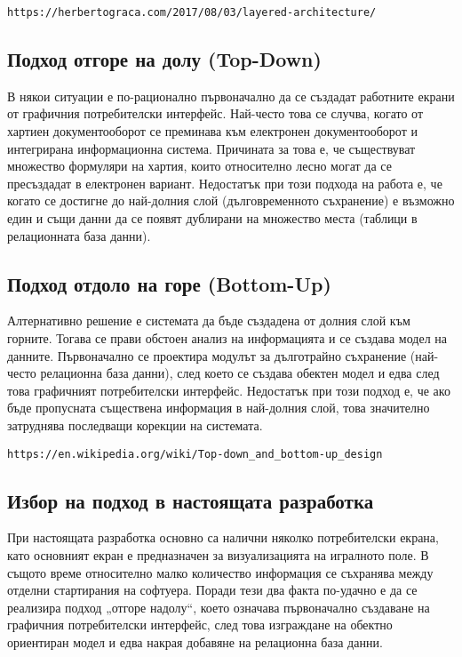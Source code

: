 \begin{lstlisting}
https://herbertograca.com/2017/08/03/layered-architecture/
\end{lstlisting}

\subsection{Подход отгоре на долу (Top-Down)}

В някои ситуации е по-рационално първоначално да се създадат работните екрани от графичния потребителски интерфейс. Най-често това се случва, когато от хартиен документооборот се преминава към електронен документооборот и интегрирана информационна система. Причината за това е, че съществуват множество формуляри на хартия, които относително лесно могат да се пресъздадат в електронен вариант. Недостатък при този подхода на работа е, че когато се достигне до най-долния слой (дълговременното съхранение) е възможно един и същи данни да се появят дублирани на множество места (таблици в релационната база данни). 

\subsection{Подход отдоло на горе (Bottom-Up)}

Алтернативно решение е системата да бъде създадена от долния слой към горните. Тогава се прави обстоен анализ на информацията и се създава модел на данните. Първоначално се проектира модулът за дълготрайно съхранение (най-често релационна база данни), след което се създава обектен модел и едва след това графичният потребителски интерфейс. Недостатък при този подход е, че ако бъде пропусната съществена информация в най-долния слой, това значително затруднява последващи корекции на системата. 

\begin{lstlisting}
https://en.wikipedia.org/wiki/Top-down_and_bottom-up_design
\end{lstlisting}

\subsection{Избор на подход в настоящата разработка}

При настоящата разработка основно са налични няколко потребителски екрана, като основният екран е предназначен за визуализацията на игралното поле. В същото време относително малко количество информация се съхранява между отделни стартирания на софтуера. Поради тези два факта по-удачно е да се реализира подход „отгоре надолу“, което означава първоначално създаване на графичния потребителски интерфейс, след това изграждане на обектно ориентиран модел и едва накрая добавяне на релационна база данни. 

